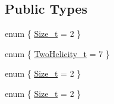 \subsection*{Public Types}
\begin{DoxyCompactItemize}
\item 
enum \{ \mbox{\hyperlink{structHadron_1_1H7o2D2ERep_ae62d0d0842363ba9d8b13fdabfc58d63a072187941e138dda707068704d456966}{Size\+\_\+t}} = 2
 \}
\item 
enum \{ \mbox{\hyperlink{structHadron_1_1H7o2D2ERep_ab3eab62f37d1697e209fc3700f3e6e77a633c8537531428a063772fb4982979ee}{Two\+Helicity\+\_\+t}} = 7
 \}
\item 
enum \{ \mbox{\hyperlink{structHadron_1_1H7o2D2ERep_ae62d0d0842363ba9d8b13fdabfc58d63a072187941e138dda707068704d456966}{Size\+\_\+t}} = 2
 \}
\item 
enum \{ \mbox{\hyperlink{structHadron_1_1H7o2D2ERep_ae62d0d0842363ba9d8b13fdabfc58d63a072187941e138dda707068704d456966}{Size\+\_\+t}} = 2
 \}
\end{DoxyCompactItemize}
